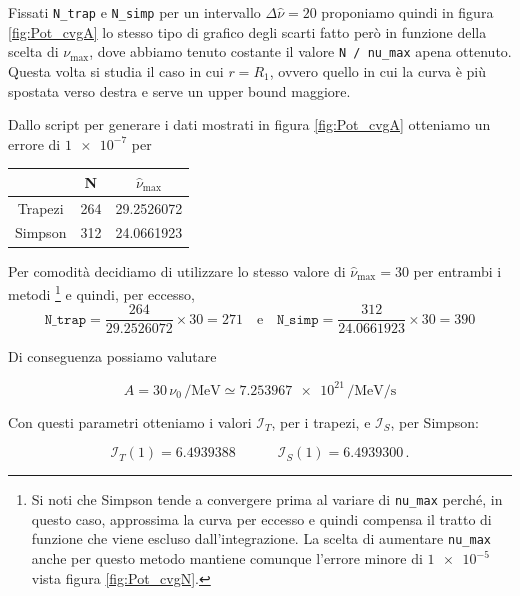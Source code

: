 \documentclass[a4paper, titlepage]{article}
\begin{document}
Fissati \texttt{N\_trap} e \texttt{N\_simp} per un intervallo $\Delta \hat \nu = 20$ proponiamo quindi in figura \ref{fig:Pot_cvgA} lo stesso tipo di grafico degli scarti fatto però in funzione della scelta di $\nu_\text{max}$, dove abbiamo tenuto costante il valore \texttt{N / nu\_max} apena ottenuto.
Questa volta si studia il caso in cui $r = R_1$, ovvero quello in cui la curva è più spostata verso destra e serve un upper bound maggiore.

Dallo script per generare i dati mostrati in figura \ref{fig:Pot_cvgA} otteniamo un errore di $\num{1e-7}$ per

\begin{table}[h]
    \centering
    \begin{tabular}{ccc}
         & N & $\hat \nu_\text{max}$ \\
        \hline
        Trapezi & 264 & 29.2526072 \\
        \hline
        Simpson & 312 & 24.0661923 \\
    \end{tabular}
\end{table}

Per comodità decidiamo di utilizzare lo stesso valore di $\hat \nu_\text{max} = 30$ per entrambi i metodi 
\footnote{Si noti che Simpson tende a convergere prima al variare di \texttt{nu\_max} perché, in questo caso, approssima la curva per eccesso e quindi compensa il tratto di funzione che viene escluso dall'integrazione.
La scelta di aumentare \texttt{nu\_max} anche per questo metodo mantiene comunque l'errore minore di $\num{1e-5}$ vista figura \ref{fig:Pot_cvgN}.}
e quindi, per eccesso, 
\begin{equation}
    \texttt{N\_trap} = \frac{264}{29.2526072} \times 30 = 271
    \quad \text{e} \quad
    \texttt{N\_simp} = \frac{312}{24.0661923} \times 30 = 390
\end{equation}

Di conseguenza possiamo valutare

\begin{equation}
    A = 30 \, \nu_0 \, \unit{\per\mega\electronvolt} \simeq \num{7.253967e21} \, \unit{\per\mega\electronvolt\per\second}
    \label{eq:A_giusto}
\end{equation}

Con questi parametri otteniamo i valori $\mathcal I_T$, per i trapezi, e $\mathcal I_S$, per Simpson:

\begin{equation}
    \mathcal I_T (1) = 6.4939388
    \quad \quad \quad
    \mathcal I_S (1) = 6.4939300 \, .
    \label{eq:val_I}
\end{equation}
\end{document}
